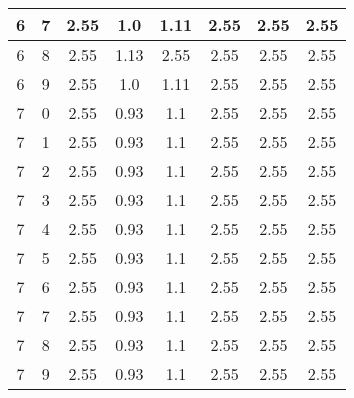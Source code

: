 \begin{longtable}{|c|c||c||c|c|c||c|c|}
	6 & 7 & 2.55 & 1.0 & 1.11 & 2.55 & 2.55 & 2.55 \\ \hline
	6 & 8 & 2.55 & 1.13 & 2.55 & 2.55 & 2.55 & 2.55 \\ \hline
	6 & 9 & 2.55 & 1.0 & 1.11 & 2.55 & 2.55 & 2.55 \\ \hline
	7 & 0 & 2.55 & 0.93 & 1.1 & 2.55 & 2.55 & 2.55 \\ \hline
	7 & 1 & 2.55 & 0.93 & 1.1 & 2.55 & 2.55 & 2.55 \\ \hline
	7 & 2 & 2.55 & 0.93 & 1.1 & 2.55 & 2.55 & 2.55 \\ \hline
	7 & 3 & 2.55 & 0.93 & 1.1 & 2.55 & 2.55 & 2.55 \\ \hline
	7 & 4 & 2.55 & 0.93 & 1.1 & 2.55 & 2.55 & 2.55 \\ \hline
	7 & 5 & 2.55 & 0.93 & 1.1 & 2.55 & 2.55 & 2.55 \\ \hline
	7 & 6 & 2.55 & 0.93 & 1.1 & 2.55 & 2.55 & 2.55 \\ \hline
	7 & 7 & 2.55 & 0.93 & 1.1 & 2.55 & 2.55 & 2.55 \\ \hline
	7 & 8 & 2.55 & 0.93 & 1.1 & 2.55 & 2.55 & 2.55 \\ \hline
	7 & 9 & 2.55 & 0.93 & 1.1 & 2.55 & 2.55 & 2.55 \\ \hline
\end{longtable}
\clearpage{}
